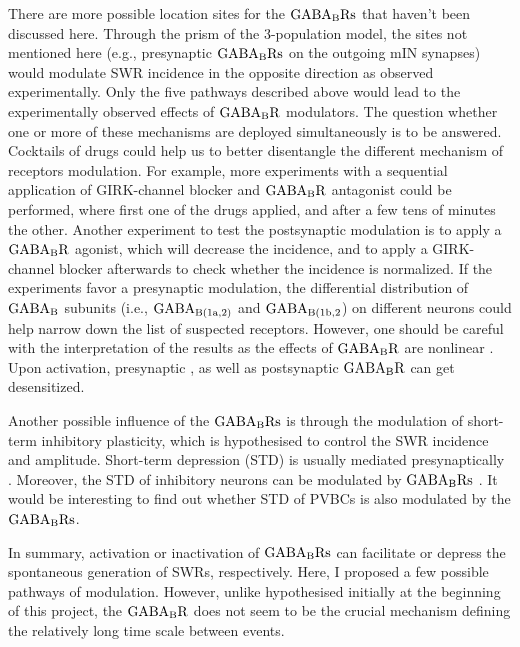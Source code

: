     There are more possible location sites for the $\rm GABA_BRs$ that haven't
    been discussed here. Through the prism of the 3-population model, the sites
    not mentioned here (e.g., presynaptic $\rm GABA_BRs$ on the outgoing mIN
    synapses) would modulate SWR incidence in the opposite direction as observed
    experimentally. Only the five pathways described above would lead to the
    experimentally observed effects of $\rm GABA_BR$ modulators. The question
    whether one or more of these mechanisms are deployed simultaneously is to
    be answered. Cocktails of drugs could help us to better disentangle the
    different mechanism of receptors modulation. For example, more experiments
    with a sequential application of GIRK-channel blocker and $\rm GABA_BR$ antagonist could be
    performed, where first one of the drugs applied, and after a few tens of
    minutes the other. Another experiment to test the postsynaptic modulation
    is to apply a $\rm GABA_BR$ agonist, which will decrease the incidence, and
    to apply a GIRK-channel blocker afterwards to check whether the incidence
    is normalized. If the experiments favor a presynaptic modulation, the
    differential distribution of $\rm GABA_B$ subunits (i.e., $\rm
    GABA_{B(1a,2)}$ and $\rm GABA_{B(1b,2}$) on different neurons could help
    narrow down the list of suspected receptors. However, one should be careful
    with the interpretation of the results as the effects of $\rm GABA_BR$ are
    nonlinear \citep{Brenowitz1998}. Upon activation, presynaptic
    \citep{Schwenk2010}, as well as postsynaptic \citep{Wetherington2002} $\rm
    GABA_BR$ can get desensitized.

    Another possible influence of the $\rm GABA_{B}Rs$ is through the
    modulation of short-term inhibitory plasticity, which is hypothesised to
    control the SWR incidence and amplitude. Short-term depression (STD) is
    usually mediated presynaptically \citep{Kraushaar2000}. Moreover, the STD
    of inhibitory neurons can be modulated by $\rm GABA_BRs$ \citep{Lei2003}.
    It would be interesting to find out whether STD of PVBCs is also modulated
    by the $\rm GABA_BRs$.

    In summary, activation or inactivation of $\rm GABA_BRs$ can facilitate or
    depress the spontaneous generation of SWRs, respectively. Here, I proposed
    a few possible pathways of modulation. However, unlike hypothesised
    initially at the beginning of this project, the $\rm GABA_BR$ does not seem
    to be the crucial mechanism defining the relatively long time scale between
    events.
        
